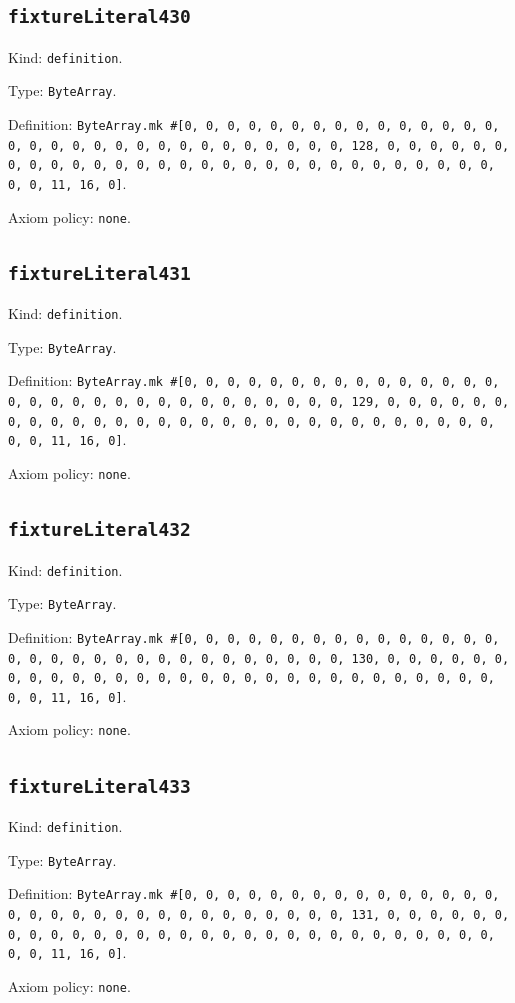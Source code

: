 \documentclass[11pt]{article}
\begin{document}
\subsection*{\texttt{fixtureLiteral430}}
\noindent Kind: \texttt{definition}.\par
\noindent Type: \texttt{ByteArray}.\par
\noindent Definition: \texttt{ByteArray.mk \#[0, 0, 0, 0, 0, 0, 0, 0, 0, 0, 0, 0, 0, 0, 0, 0, 0, 0, 0, 0, 0, 0, 0, 0, 0, 0, 0, 0, 0, 0, 0, 128, 0, 0, 0, 0, 0, 0, 0, 0, 0, 0, 0, 0, 0, 0, 0, 0, 0, 0, 0, 0, 0, 0, 0, 0, 0, 0, 0, 0, 0, 0, 0, 11, 16, 0]}.\par
\noindent Axiom policy: \texttt{none}.\par
\subsection*{\texttt{fixtureLiteral431}}
\noindent Kind: \texttt{definition}.\par
\noindent Type: \texttt{ByteArray}.\par
\noindent Definition: \texttt{ByteArray.mk \#[0, 0, 0, 0, 0, 0, 0, 0, 0, 0, 0, 0, 0, 0, 0, 0, 0, 0, 0, 0, 0, 0, 0, 0, 0, 0, 0, 0, 0, 0, 0, 129, 0, 0, 0, 0, 0, 0, 0, 0, 0, 0, 0, 0, 0, 0, 0, 0, 0, 0, 0, 0, 0, 0, 0, 0, 0, 0, 0, 0, 0, 0, 0, 11, 16, 0]}.\par
\noindent Axiom policy: \texttt{none}.\par
\subsection*{\texttt{fixtureLiteral432}}
\noindent Kind: \texttt{definition}.\par
\noindent Type: \texttt{ByteArray}.\par
\noindent Definition: \texttt{ByteArray.mk \#[0, 0, 0, 0, 0, 0, 0, 0, 0, 0, 0, 0, 0, 0, 0, 0, 0, 0, 0, 0, 0, 0, 0, 0, 0, 0, 0, 0, 0, 0, 0, 130, 0, 0, 0, 0, 0, 0, 0, 0, 0, 0, 0, 0, 0, 0, 0, 0, 0, 0, 0, 0, 0, 0, 0, 0, 0, 0, 0, 0, 0, 0, 0, 11, 16, 0]}.\par
\noindent Axiom policy: \texttt{none}.\par
\subsection*{\texttt{fixtureLiteral433}}
\noindent Kind: \texttt{definition}.\par
\noindent Type: \texttt{ByteArray}.\par
\noindent Definition: \texttt{ByteArray.mk \#[0, 0, 0, 0, 0, 0, 0, 0, 0, 0, 0, 0, 0, 0, 0, 0, 0, 0, 0, 0, 0, 0, 0, 0, 0, 0, 0, 0, 0, 0, 0, 131, 0, 0, 0, 0, 0, 0, 0, 0, 0, 0, 0, 0, 0, 0, 0, 0, 0, 0, 0, 0, 0, 0, 0, 0, 0, 0, 0, 0, 0, 0, 0, 11, 16, 0]}.\par
\noindent Axiom policy: \texttt{none}.\par
\end{document}
